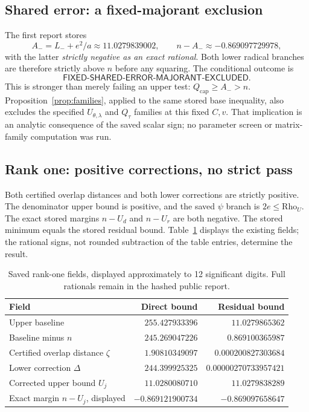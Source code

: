 \documentclass[11pt,a4paper]{article}
\newcommand{\Qcap}{Q_{\mathrm{cap}}}
\theoremstyle{definition}
\theoremstyle{remark}
\numberwithin{equation}{section}
\begin{document}
\subsection{Shared error: a fixed-majorant exclusion}

The first report stores
\[
 A_-=L_-+e^2/a\approx11.0279839002,\qquad
 n-A_-\approx-0.869097729978,
\]
with the latter \emph{strictly negative as an exact rational}.
Both lower radical branches are therefore strictly above $n$ before
any squaring. The conditional outcome is
\[
 \textsf{FIXED-SHARED-ERROR-MAJORANT-EXCLUDED}.
\]
This is stronger than merely failing an upper test:
$\Qcap\ge A_->n$. Proposition~\ref{prop:families}, applied to the
same stored base inequality, also excludes the specified
$U_{\theta,\lambda}$ and $Q_\tau$ families at this fixed $C,v$.
That implication is an analytic consequence of the saved scalar sign;
no parameter screen or matrix-family computation was run.

\subsection{Rank one: positive corrections, no strict pass}

Both certified overlap distances and both lower corrections are
strictly positive. The denominator upper bound is positive, and the
saved $\psi$ branch is $2e\le\mathrm{Rho}_U$.
The exact stored margins $n-U_d$ and $n-U_r$ are both negative.
The stored minimum equals the stored residual bound. Table~\ref{tab:rank}
displays the existing fields; the rational signs, not rounded
subtraction of the table entries, determine the result.

\begin{table}[htbp]
\centering
\caption{Saved rank-one fields, displayed approximately to 12 significant
digits. Full rationals remain in the hashed public report.}
\label{tab:rank}
\begin{tabular}{lrr}
\toprule
Field & Direct bound & Residual bound\\
\midrule
Upper baseline & $255.427933396$ & $11.0279865362$\\
Baseline minus $n$ & $245.269047226$ & $0.869100365987$\\
Certified overlap distance $\zeta$ & $1.90810349097$ & $0.000200827303684$\\
Lower correction $\Delta$ & $244.399925325$ & $0.00000270733957421$\\
Corrected upper bound $U_j$ & $11.0280080710$ & $11.0279838289$\\
Exact margin $n-U_j$, displayed & $-0.869121900734$ & $-0.869097658647$\\
\bottomrule
\end{tabular}
\end{table}
\end{document}
